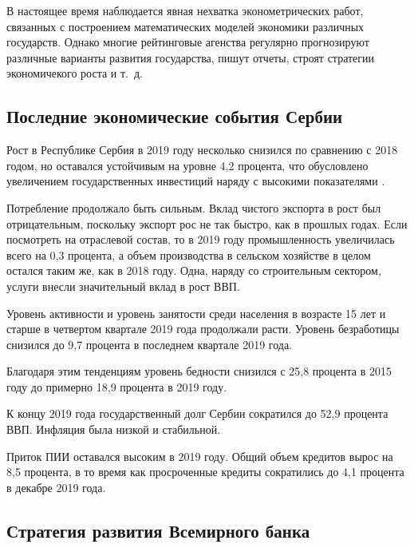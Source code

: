 
В настоящее время наблюдается явная нехватка эконометрических работ, связанных с построением математических моделей экономики различных государств.
Однако многие рейтинговые агенства регулярно прогнозируют различные варианты развития государства, пишут отчеты, строят стратегии экономичекого роста и т.~д.

\subsection{Последние экономические события Сербии}

Рост в Республике Сербия в 2019 году несколько снизился по сравнению с 2018 годом, но оставался устойчивым на уровне 4,2 процента, что обусловлено увеличением государственных инвестиций наряду с высокими показателями .

Потребление продолжало быть сильным.
Вклад чистого экспорта в рост был отрицательным, поскольку экспорт рос не так быстро, как в прошлых годах.
Если посмотреть на отраслевой состав, то в 2019 году промышленность увеличилась всего на 0,3 процента, а объем производства в сельском хозяйстве в целом остался таким же, как в 2018 году.
Одна, наряду со строительным сектором, услуги внесли значительный вклад в рост ВВП.

Уровень активности и уровень занятости среди населения в возрасте 15 лет и старше в четвертом квартале 2019 года продолжали расти.
Уровень безработицы снизился до 9,7 процента в последнем квартале 2019 года.

Благодаря этим тенденциям уровень бедности снизился с 25,8 процента в 2015 году до примерно 18,9 процента в 2019 году.

К концу 2019 года государственный долг Сербии сократился до 52,9 процента ВВП.
Инфляция была низкой и стабильной.

Приток ПИИ оставался высоким в 2019 году.
Общий объем кредитов вырос на 8,5 процента, в то время как просроченные кредиты сократились до 4,1 процента в декабре 2019 года.

\subsection{Стратегия развития Всемирного банка}

